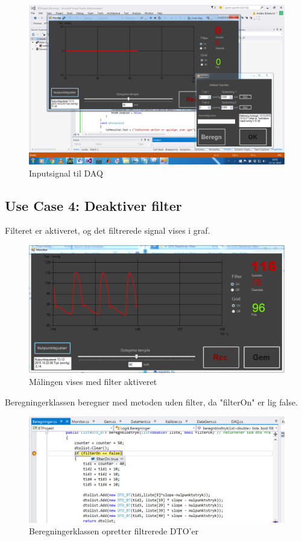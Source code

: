 \begin{figure}[H]
	\centering
	\includegraphics[width=1\textwidth]{Figurer/Test_Nul_3}
	\caption{Inputsignal til DAQ}
\end{figure}


\subsection{Use Case 4: Deaktiver filter}

Filteret er aktiveret, og det filtrerede signal vises i graf.

\begin{figure}[H]
	\centering
	\includegraphics[width=1\textwidth]{Figurer/Test_Deaktiver_1}
	\caption{Målingen vises med filter aktiveret}
\end{figure}

Beregningerklassen beregner med metoden uden filter, da "filterOn" er lig false.

\begin{figure}[H]
	\centering
	\includegraphics[width=1\textwidth]{Figurer/Test_Deaktiver_2}
	\caption{Beregningerklassen opretter filtrerede DTO'er}
\end{figure}

